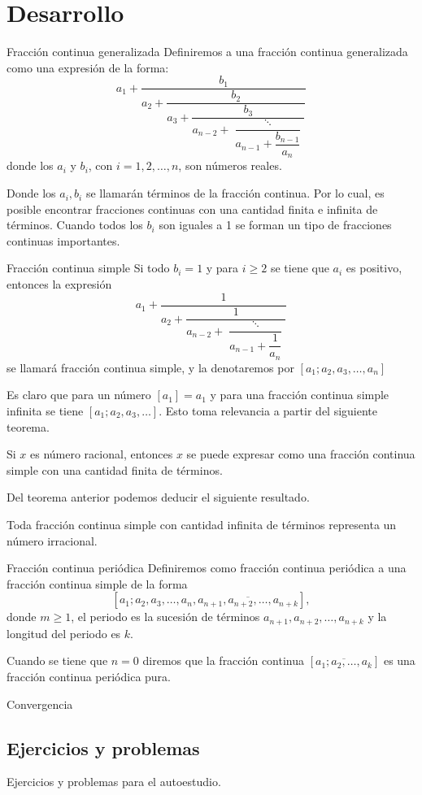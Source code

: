 \section{Desarrollo}

\begin{definition.box}{Fracción continua generalizada}{}
    Definiremos a una fracción continua generalizada como una expresión de la forma:
    \[
        a_1 + \dfrac{b_1}{a_2 + \dfrac{b_2}{a_3 + \dfrac{b_3}{a_{n - 2} + \dfrac{\ddots}{a_{n - 1} + \dfrac{b_{n -1}}{a_n}}}}}
    \]
    donde los $a_i$ y $b_i$, con $i =1,2, \ldots, n$, son números reales.
\end{definition.box}
Donde los $a_i, b_i$ se llamarán términos de la fracción continua.
Por lo cual, es posible encontrar fracciones continuas con una cantidad finita e infinita de términos.
Cuando todos los $b_i$ son iguales a 1 se forman un tipo de fracciones continuas importantes.

\begin{definition.box}{Fracción continua simple}{}
    Si todo $b_i = 1$ y para $i \geq 2$ se tiene que $a_i$ es positivo, entonces la expresión
    \[
        a_1 + \dfrac{1}{a_2 + \dfrac{1}{a_{n - 2} + \dfrac{\ddots}{a_{n - 1} + \dfrac{1}{a_n}}}}
    \]
    se llamará fracción continua simple, y la denotaremos por $[a_1; a_2, a_3, \ldots, a_n]$
\end{definition.box}
Es claro que para un número $[a_1] = a_1$ y para una fracción continua simple infinita se tiene $[a_1; a_2, a_3, \ldots]$.
Esto toma relevancia a partir del siguiente teorema.

\begin{theorem.box}{}{}
    Si $x$ es número racional, entonces $x$ se puede expresar como una fracción continua simple con una cantidad finita de términos.
\end{theorem.box}

Del teorema anterior podemos deducir el siguiente resultado.

\begin{corollary}
    Toda fracción continua simple con cantidad infinita de términos representa un número irracional.
\end{corollary}

\begin{definition.box}{Fracción continua periódica}{}
    Definiremos como fracción continua periódica a una fracción continua simple de la forma
    \[
        [a_1; a_2, a_3, \ldots, a_n, \overline{a_{n + 1}, a_{n + 2},\ldots, a_{n + k}}],
    \]
    donde $m \geq 1$, el periodo es la sucesión de términos $a_{n + 1}, a_{n + 2},\ldots, a_{n + k}$ y la longitud del periodo es $k$.
\end{definition.box}

Cuando se tiene que $n = 0$ diremos que la fracción continua $[\overline{a_1;a_2, \ldots, a_k}]$ es una fracción continua periódica pura.


\begin{center}
    Convergencia
\end{center}

\subsection{Ejercicios y problemas}

Ejercicios y problemas para el autoestudio.